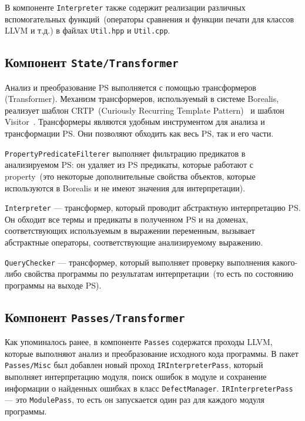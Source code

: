 В компоненте \texttt{Interpreter} также содержит реализации различных 
вспомогательных функций~(операторы сравнения и функции печати для классов LLVM
и т.д.) в файлах \texttt{Util.hpp} и \texttt{Util.cpp}.

\subsection{Компонент \texttt{State/Transformer}}
Анализ и преобразование PS выполняется с помощью трансформеров (Transformer). 
Механизм трансформеров, используемый в системе Borealis, реализует шаблон 
CRTP~(Curiously Recurring Template Pattern)~\cite{crtp} и шаблон 
Visitor~\cite{visitor}. Трансформеры являются удобным инструментом для анализа 
и трансформации PS. Они позволяют обходить как весь PS, так и его части.

\texttt{PropertyPredicateFilterer} выполняет фильтрацию предикатов в 
анализируемом PS: он удаляет из PS предикаты, которые работают с property~(это
некоторые дополнительные свойства объектов, которые используются в Borealis и
не имеют значения для интерпретации).

\texttt{Interpreter} --- трансформер, который проводит абстрактную интерпретацию
PS. Он обходит все термы и предикаты в полученном PS и на доменах,
соответствующих используемым в выражении переменным, вызывает абстрактные 
операторы, соответствующие анализируемому выражению.

\texttt{QueryChecker} --- трансформер, который выполняет проверку выполнения
какого-либо свойства программы по результатам интерпретации~(то есть по 
состоянию программы на выходе PS).

\subsection{Компонент \texttt{Passes/Transformer}}
Как упоминалось ранее, в компоненте \texttt{Passes} содержатся проходы LLVM,
которые выполняют анализ и преобразование исходного кода программы. В пакет \texttt{Passes/Misc} был добавлен новый проход
\texttt{IRInterpreterPass}, который выполняет интерпретацию модуля, поиск 
ошибок в модуле и сохранение информации о найденных ошибках в класс 
\texttt{DefectManager}. \texttt{IRInterpreterPass} --- это \texttt{ModulePass}, то есть он запускается один раз для каждого модуля программы.

